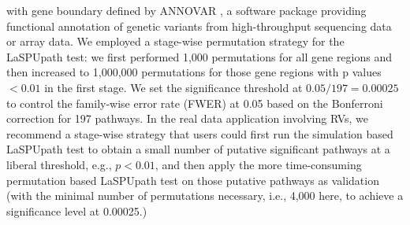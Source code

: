 \documentclass[12pt]{article}
\begin{document}
with gene boundary defined by ANNOVAR \cite{Wang2010a}, a software package providing functional annotation of genetic variants from high-throughput sequencing data or array data.
We employed a stage-wise permutation strategy for the LaSPUpath test: we first performed 1,000 permutations for all gene regions and then increased to 1,000,000 permutations for those gene regions with p values $< 0.01$ in the first stage. We set the significance threshold at $0.05/197 = 0.00025$ to control the family-wise error rate (FWER) at 0.05 based on the Bonferroni correction for 197 pathways. In the real data application involving RVs, we recommend a stage-wise strategy that users could first run the simulation based LaSPUpath test to obtain a small number of putative significant pathways at a liberal threshold, e.g., $p < 0.01$, and then apply the more time-consuming permutation based LaSPUpath test on those putative pathways as validation (with the minimal number of permutations necessary, i.e., 4,000 here, to achieve a significance level at 0.00025.)
\end{document}
